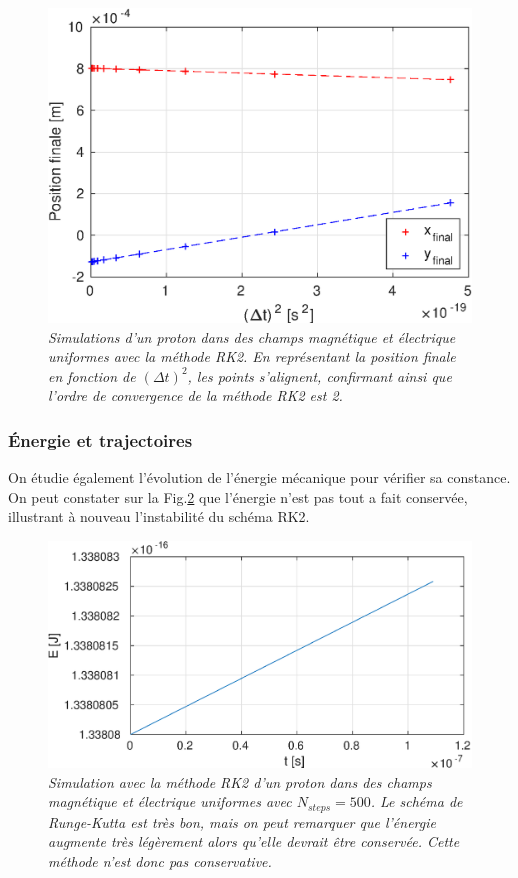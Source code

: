 \documentclass[a4paper,12pt,oneside]{article}
\begin{document}
\begin{figure}[H]
\centerline{\includegraphics[width=0.78\linewidth,angle=0]{application1/etudeConv1_2}}
\caption{ \label{etudeConv1_2}\em
 Simulations d'un proton dans des champs magnétique et électrique uniformes avec la méthode RK2. En représentant la position finale en fonction de $(\Delta t)^2$, les points s'alignent, confirmant ainsi que l'ordre de convergence de la méthode RK2 est 2.
}
\end{figure}

\subsubsection{Énergie et trajectoires}
On étudie également l'évolution de l'énergie mécanique pour vérifier sa constance. On peut constater sur la Fig.\ref{RK2Energy1} que l'énergie n'est pas tout a fait conservée, illustrant à nouveau l'instabilité du schéma RK2.
\begin{figure}[H]
\centerline{\includegraphics[width=0.8\linewidth,angle=0]{application1/RK2Energy1}}
\caption{ \label{RK2Energy1}\em
 Simulation avec la méthode RK2 d'un proton dans des champs magnétique et électrique uniformes avec $N_{steps}=500$. Le schéma de Runge-Kutta est très bon, mais on peut remarquer que l'énergie augmente très légèrement alors qu'elle devrait être conservée. Cette méthode n'est donc pas conservative.
}
\end{figure}
\end{document}
